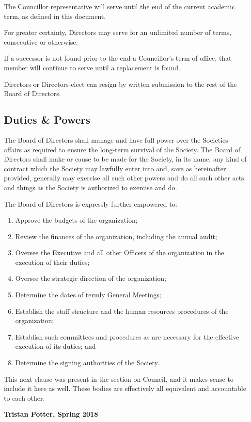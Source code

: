 The Councillor representative will serve until the end of the current academic
term, as defined in this document. 

For greater certainty, Directors may serve for an unlimited number of terms, 
consecutive or otherwise. 

If a successor is not found prior to the end a Councillor's term of office, that
member will continue to serve until a replacement is found. 

Directors or Directors-elect can resign by written submission to the rest of
the Board of Directors. 

\subsection{Duties \& Powers}

The Board of Directors shall manage and have full power over the Societies
affairs as required to ensure the long-term survival of the Society.  The Board
of Directors shall make or cause to be made for the Society, in its name, any
kind of contract which the Society may lawfully enter into and, save as
hereinafter provided, generally may exercise all such other powers and do all
such other acts and things as the Society is authorized to exercise and do.

The Board of Directors is expressly further empowered to:
\begin{enumerate}
    \item Approve the budgets of the organization;
    \item Review the finances of the organization, including the annual audit;
    \item Oversee the Executive and all other Officers of the organization in
        the execution of their duties;
    \item Oversee the strategic direction of the organization;
    \item Determine the dates of termly General Meetings;
    \item Establish the staff structure and the human resources procedures of
        the organization;
    \item Establish such committees and procedures as are necessary for the
        effective execution of its duties; and
    \item Determine the signing authorities of the Society. 
\end{enumerate}

\begin{annotation}
    This next clause was present in the section on Council, and it makes sense
    to include it here as well. These bodies are effectively all equivalent
    and accountable to each other.

    \textbf{Tristan Potter, Spring 2018}
\end{annotation}

